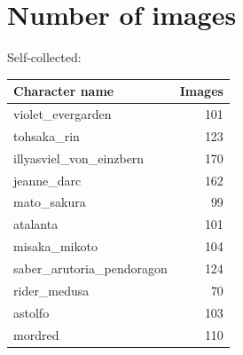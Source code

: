 \documentclass[11.5pt]{article}
\begin{document}

    \newpage
    
    {}

    \clearpage
    \twocolumn
    \appendix
    \appendixpage
    \addappheadtotoc


    \section{Number of images}\label{sec:dataset-information}

    Self-collected: \vspace{3mm}\\
    \begin{supertabular}[h!]{lr}
        Character name & Images \\ \hline
        violet\_evergarden & 101 \\
        tohsaka\_rin & 123 \\
        illyasviel\_von\_einzbern & 170 \\
        jeanne\_darc & 162 \\
        mato\_sakura & 99 \\
        atalanta & 101 \\
        misaka\_mikoto & 104 \\
        saber\_arutoria\_pendoragon & 124 \\
        rider\_medusa & 70 \\
        astolfo & 103 \\
        mordred & 110 \\
    \end{supertabular} \vspace{10mm} \\
\end{document}
